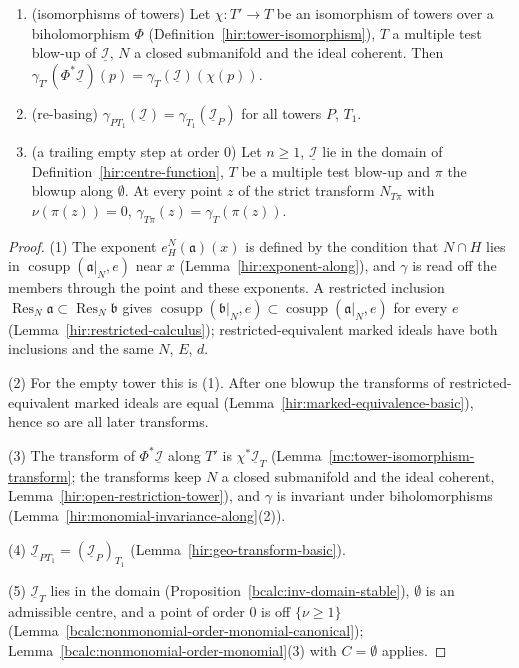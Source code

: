 \begin{lemma}
\begin{enumerate}
\item (isomorphisms of towers) Let \(\chi\colon T'\to T\) be an isomorphism of towers over a biholomorphism \(\Phi\) (Definition~\ref{hir:tower-isomorphism}),
\(T\) a multiple test blow-up of \(\underline{\mathcal I}\), \(N\) a closed submanifold and the ideal coherent. Then \(\gamma_{T'}(\Phi^*\underline{\mathcal I})(p)=\gamma_T(\underline{\mathcal I})(\chi(p))\).
\item (re-basing) \(\gamma_{PT_1}(\underline{\mathcal I})=\gamma_{T_1}(\underline{\mathcal I}_P)\) for all towers \(P\), \(T_1\).
\item (a trailing empty step at order \(0\)) Let \(n\ge1\), \(\underline{\mathcal I}\) lie in the domain of Definition~\ref{hir:centre-function}, \(T\) be a multiple test blow-up and
\(\pi\) the blowup along \(\emptyset\). At every point \(z\) of the strict transform \(N_{T\pi}\) with \(\nu(\pi(z))=0\), \(\gamma_{T\pi}(z)=\gamma_T(\pi(z))\).
\end{enumerate}
\end{lemma}
\begin{proof}
\mixedleanok
(1) The exponent \(e^N_H(\mathfrak a)(x)\) is defined by the condition that \(N\cap H\) lies in \(\operatorname{cosupp}(\mathfrak a|_N,e)\) near \(x\)
(Lemma~\ref{hir:exponent-along}), and \(\gamma\) is read off the members through the point and these exponents. A restricted inclusion
\(\operatorname{Res}_N\mathfrak a\subset\operatorname{Res}_N\mathfrak b\) gives \(\operatorname{cosupp}(\mathfrak b|_N,e)\subset\operatorname{cosupp}(\mathfrak a|_N,e)\) for every \(e\)
(Lemma~\ref{hir:restricted-calculus}); restricted-equivalent marked ideals have both inclusions and the same \(N\), \(E\), \(d\).

(2) For the empty tower this is (1). After one blowup the transforms of restricted-equivalent marked ideals are equal (Lemma~\ref{hir:marked-equivalence-basic}),
hence so are all later transforms.

(3) The transform of \(\Phi^*\underline{\mathcal I}\) along \(T'\) is \(\chi^*\underline{\mathcal I}_T\) (Lemma~\ref{mc:tower-isomorphism-transform}; the transforms keep \(N\) a closed submanifold
and the ideal coherent, Lemma~\ref{hir:open-restriction-tower}), and \(\gamma\) is invariant under biholomorphisms (Lemma~\ref{hir:monomial-invariance-along}(2)).

(4) \(\underline{\mathcal I}_{PT_1}=(\underline{\mathcal I}_P)_{T_1}\) (Lemma~\ref{hir:geo-transform-basic}).

(5) \(\underline{\mathcal I}_T\) lies in the domain (Proposition~\ref{bcalc:inv-domain-stable}), \(\emptyset\) is an admissible centre, and a point of order \(0\) is off \(\{\nu\ge1\}\)
(Lemma~\ref{bcalc:nonmonomial-order-monomial-canonical}); Lemma~\ref{bcalc:nonmonomial-order-monomial}(3) with \(C=\emptyset\) applies.
\end{proof}

